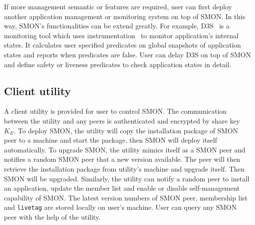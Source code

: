 If more management semantic or features are required, user
can first deploy another application management or
monitoring system on top of SMON. In this way, SMON's
functionalities can be extend greatly. For
example, D3S~\cite{Liu2008} is a monitoring tool which uses
instrumentation~\cite{Guo2008} to monitor application's internal
states. It calculates user specified predicates on global
snapshots of application states and reports when predicates
are false. User can delay D3S on top of SMON and define
safety or liveness predicates to check application states in
detail.


\subsection{Client utility}
\label{subsec:client}

A client utility is provided for user to control SMON. The
communication between the utility and any peers is
authenticated and encrypted by share key $K_E$. To deploy
SMON, the utility will copy the installation package of SMON
peer to a machine and start the package, then SMON will
deploy itself automatically. To upgrade SMON, the utility
mimics itself as a SMON peer and notifies a random SMON peer
that a new version available.  The peer will then retrieve
the installation package from utility's machine and upgrade
itself. Then SMON will be upgraded.  Similarly, the utility
can notify a random peer to install an application, update
the member list and enable or disable self-management
capability of SMON. The latest version numbers of SMON peer,
membership list and \texttt{livetag} are stored locally on
user's machine.  User can query any SMON peer with the help
of the utility.







